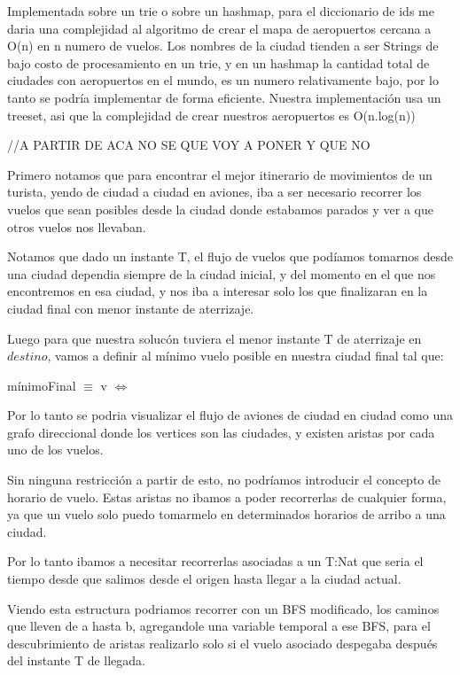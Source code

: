 Implementada sobre un trie o sobre un hashmap, para el diccionario de ids me daria una complejidad al algoritmo de crear el mapa de aeropuertos cercana a O(n) en n numero de vuelos. Los nombres de la ciudad tienden a ser Strings de bajo costo de procesamiento en un trie, y en un hashmap la cantidad total de ciudades con aeropuertos en el mundo, es un numero relativamente bajo, por lo tanto se podr\'ia implementar de forma eficiente.
Nuestra implementaci\'on usa un treeset, asi que la complejidad de crear nuestros aeropuertos es O(n.log(n))

//A PARTIR DE ACA NO SE QUE VOY A PONER Y QUE NO


Primero notamos que para encontrar el mejor itinerario de movimientos de un turista, yendo de ciudad a ciudad en aviones, iba a ser necesario recorrer los vuelos que sean posibles desde la ciudad donde estabamos parados y ver a que otros vuelos nos llevaban. 

Notamos que dado un instante T, el flujo de vuelos que pod\'iamos tomarnos desde una ciudad dependia siempre de la ciudad inicial, y del momento en el que nos encontremos en esa ciudad, y nos iba a interesar solo los que finalizaran en la ciudad final con menor instante de aterrizaje.

Luego para que nuestra soluc\'on tuviera el menor instante T de aterrizaje en $destino$, vamos a definir al m\'inimo vuelo posible en nuestra ciudad final tal que:

m\'inimoFinal $\equiv$ v $\Leftrightarrow$ 


Por lo tanto se podria visualizar el flujo de aviones de ciudad en ciudad como una grafo direccional donde los vertices son las ciudades, y existen aristas por cada uno de los vuelos. 

Sin ninguna restricci\'on a partir de esto, no podr\'iamos introducir el concepto de horario de vuelo.
Estas aristas no ibamos a poder recorrerlas de cualquier forma, ya que un vuelo solo puedo tomarmelo en determinados horarios de arribo a una ciudad. 

Por lo tanto ibamos a necesitar recorrerlas asociadas a un T:Nat que seria el tiempo desde que salimos desde el origen hasta llegar a la ciudad actual.

Viendo esta estructura podriamos recorrer con un BFS modificado, los caminos que lleven de a hasta b, agregandole una variable temporal a ese BFS, para el descubrimiento de aristas realizarlo solo si el vuelo asociado despegaba despu\'es del instante T de llegada.

